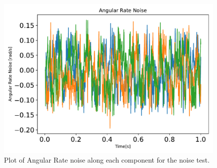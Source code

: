 \begin{figure}[htbp]\centerline{\includegraphics[height=0.7\textwidth, keepaspectratio]{AutoTeX/omegaNoise}}\caption{Plot of Angular Rate noise along each component for the noise test.}\label{fig:omegaNoise}\end{figure}